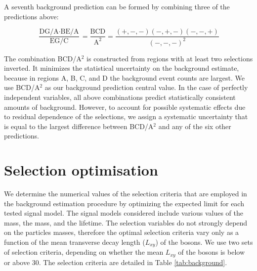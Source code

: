 

A seventh background prediction can be formed by combining three of the predictions above:

\begin{equation}
\frac{\text{DG/A}\cdot\text{BE/A}}{\text{EG/C}} = \frac{\text{BCD}}{\text{A}^2} = \frac{(+,-,-)(-,+,-)(-,-,+)}{(-,-,-)^2}
\end{equation}


The combination BCD/A$^2$ is constructed from regions with at least two selections inverted.
It minimizes the statistical uncertainty on the background estimate, because in regions 
A, B, C, and D
the background event counts are largest. We use BCD/A$^2$ as our background prediction
central value.
In the case of perfectly independent 
variables, all above combinations predict statistically consistent  amounts of background. 
However, to account for possible systematic
effects due to residual dependence of the selections, we assign a systematic uncertainty 
that is equal to the largest difference 
between BCD/A$^2$ and any of the six other predictions.

\section{Selection optimisation}
\label{sec:cutvalues}
We determine the numerical values of the selection criteria that are employed in the background estimation procedure 
by optimizing the expected limit for each tested signal model.
The signal models considered include various values of the \Higgs mass, the \X mass, and the \X lifetime.
The selection variables
do not strongly depend on the particles masses, therefore the optimal selection criteria
vary only as a function of the
mean transverse decay length ($L_{xy}$)
of the \X bosons. We use two sets of selection criteria,
depending on whether the mean
$L_{xy}$ of the \X bosons is below or above 30\cm. The selection criteria are
detailed in Table \ref{tab:background}.

